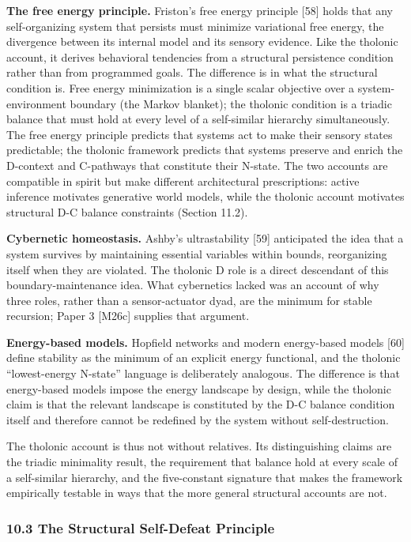 \documentclass[
  11pt,
  letterpaper,
]{article}
\begin{document}
\textbf{The free energy principle.} Friston's free energy principle
{[}58{]} holds that any self-organizing system that persists must
minimize variational free energy, the divergence between its internal
model and its sensory evidence. Like the tholonic account, it derives
behavioral tendencies from a structural persistence condition rather
than from programmed goals. The difference is in what the structural
condition is. Free energy minimization is a single scalar objective over
a system-environment boundary (the Markov blanket); the tholonic
condition is a triadic balance that must hold at every level of a
self-similar hierarchy simultaneously. The free energy principle
predicts that systems act to make their sensory states predictable; the
tholonic framework predicts that systems preserve and enrich the
D-context and C-pathways that constitute their N-state. The two accounts
are compatible in spirit but make different architectural prescriptions:
active inference motivates generative world models, while the tholonic
account motivates structural D-C balance constraints (Section 11.2).

\textbf{Cybernetic homeostasis.} Ashby's ultrastability {[}59{]}
anticipated the idea that a system survives by maintaining essential
variables within bounds, reorganizing itself when they are violated. The
tholonic D role is a direct descendant of this boundary-maintenance
idea. What cybernetics lacked was an account of why three roles, rather
than a sensor-actuator dyad, are the minimum for stable recursion; Paper
3 {[}M26c{]} supplies that argument.

\textbf{Energy-based models.} Hopfield networks and modern energy-based
models {[}60{]} define stability as the minimum of an explicit energy
functional, and the tholonic ``lowest-energy N-state'' language is
deliberately analogous. The difference is that energy-based models
impose the energy landscape by design, while the tholonic claim is that
the relevant landscape is constituted by the D-C balance condition
itself and therefore cannot be redefined by the system without
self-destruction.

The tholonic account is thus not without relatives. Its distinguishing
claims are the triadic minimality result, the requirement that balance
hold at every scale of a self-similar hierarchy, and the five-constant
signature that makes the framework empirically testable in ways that the
more general structural accounts are not.

\subsubsection{10.3 The Structural Self-Defeat
Principle}\label{the-structural-self-defeat-principle}
\end{document}
